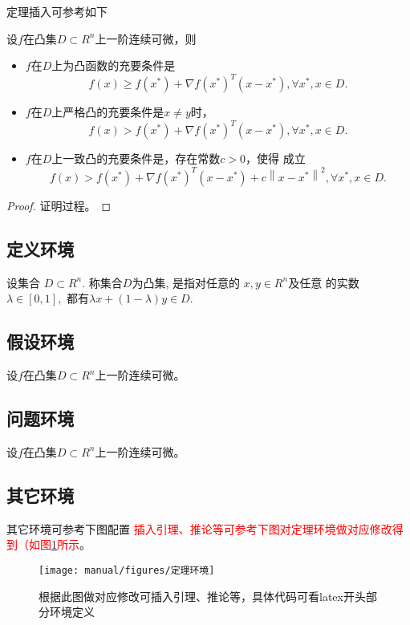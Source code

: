 定理插入可参考如下
\begin{theorem}
设$f$在凸集$D \subset {R^n}$上一阶连续可微，则
\begin{itemize}
\item $f$在$D$上为凸函数的充要条件是
\begin{equation*}
f(x) \ge f({x^*}) + \nabla f{({x^*})^T}(x - {x^*}),\forall {x^*},x \in D.
\end{equation*}
\item  $f$在$D$上严格凸的充要条件是$x \ne y$时，
\begin{equation*}
f(x) > f({x^*}) + \nabla f{({x^*})^T}(x - {x^*}),\forall {x^*},x \in D.
\end{equation*}
\item $f$在$D$上一致凸的充要条件是，存在常数$c > 0$，使得
成立
\begin{equation*}
f(x) > f({x^*}) + \nabla f{({x^*})^T}(x - {x^*}) + c{\left\| {x - {x^*}} \right\|^2},\forall {x^*},x \in D.
\end{equation*}
\end{itemize}
\end{theorem}
\begin{proof}
  证明过程。
  \end{proof}

\subsection{定义环境}
\begin{definition}
设集合 $D \subset {R^n}.$ 称集合$D$为凸集, 是指对任意的 $x,y \in {R^n}$及任意
的实数$\lambda  \in [0,1],$ 都有$\lambda x + (1 - \lambda )y \in D.$
\end{definition}

\subsection{假设环境}
\begin{assumption}
设$f$在凸集$D \subset {R^n}$上一阶连续可微。
\end{assumption}
\subsection{问题环境}
\begin{problem}
  设$f$在凸集$D \subset {R^n}$上一阶连续可微。
  \end{problem}

\subsection{其它环境}
其它环境可参考下图配置
\textcolor{red}{插入引理、推论等可参考下图对定理环境做对应修改得到（如图\ref{fig_定理环境}所示}。
 \begin{figure}[!htb]
  \centering
  \texttt{[image: manual/figures/定理环境]}
  \caption{根据此图做对应修改可插入引理、推论等，具体代码可看latex开头部分环境定义}
  \label{fig_定理环境}
\end{figure}




